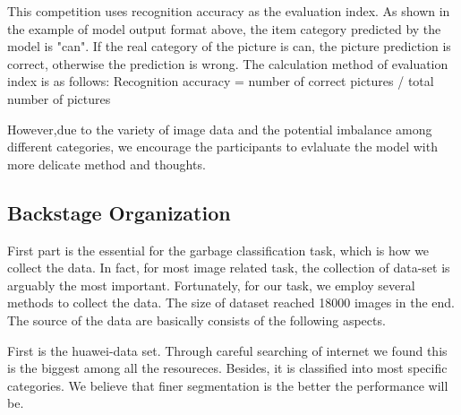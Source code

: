 This competition uses recognition accuracy as the evaluation index. As shown in the example of model output format above, the item category predicted by the model is "can". If the real category of the picture is can, the picture prediction is correct, otherwise the prediction is wrong. The calculation method of evaluation index is as follows:
Recognition accuracy = number of correct pictures / total number of pictures

However,due to the variety of image data and the potential imbalance among different categories, we encourage the participants to evlaluate the model with more delicate method and thoughts.

\subsection{Backstage Organization}

First part is the essential for the garbage classification task, which is how we collect the data. In fact, for most  image related task, the collection of data-set is arguably the most important. Fortunately, for our task, we employ several methods to collect the data. The size of dataset reached 18000 images in the end. The source of the data are basically consists of the following aspects.

First is the huawei-data set. Through careful searching of internet we found this is the biggest among all the resoureces. Besides, it is classified into most specific categories. We believe that finer segmentation is the better the performance will be.

